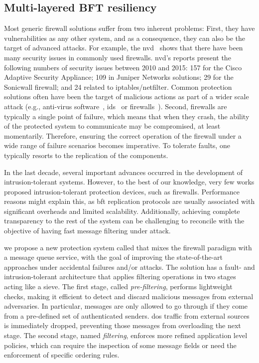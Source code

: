\subsection{Multi-layered BFT resiliency} 

Most generic firewall solutions suffer from two inherent problems: 
First, they have vulnerabilities as any other system, and as a consequence, they can also be the target of advanced attacks. 
For example, the \gls{nvd}~\cite{nvd} shows that there have been many security issues in commonly used firewalls. 
\gls{nvd}'s reports present the following numbers of security issues between 2010 and 2015: 157 for the Cisco Adaptive Security Appliance; 109 in Juniper Networks solutions; 29 for the Sonicwall firewall; and 24 related to iptables/netfilter. 
Common protection solutions often have been the target of malicious actions as part of a wider scale attack (e.g., anti-virus software~\cite{Chauhan:2011}, \gls{ids}~\cite{Anderson:2001} or firewalls~\cite{Kamara:2003,Surisetty:2010,cisco1,cisco2}).
Second, firewalls are typically a single point of failure, which means that when they crash, the ability of the protected system to communicate may be compromised, at least momentarily.
Therefore, ensuring the correct operation of the firewall under a wide range of failure scenarios becomes imperative.
To tolerate faults, one typically resorts to the replication of the components.

In the last decade, several important advances occurred in the development of intrusion-tolerant systems.
However, to the best of our knowledge, very few works proposed intrusion-tolerant protection devices, such as firewalls.
Performance reasons might explain this, as \gls{bft} replication protocols are usually associated with significant overheads and limited scalability.
Additionally, achieving complete transparency to the rest of the system can be challenging to reconcile with the objective of having fast message filtering under attack.


we propose a new protection system called \sieveq that mixes the firewall paradigm with a message queue service, with the goal of improving the state-of-the-art approaches under accidental failures and/or attacks.
The solution has a fault- and intrusion-tolerant architecture that applies filtering operations in two stages acting like a sieve.
The first stage, called \emph{pre-filtering}, performs lightweight checks, making it efficient to detect and discard malicious messages from external adversaries.
In particular, messages are only allowed to go through if they come from a pre-defined set of authenticated senders.
\gls{dos} traffic from external sources is immediately dropped, preventing those messages from overloading the next stage.
The second stage, named \emph{filtering}, enforces more refined application level policies, which can require the inspection of some message fields or need the enforcement of specific ordering rules.



